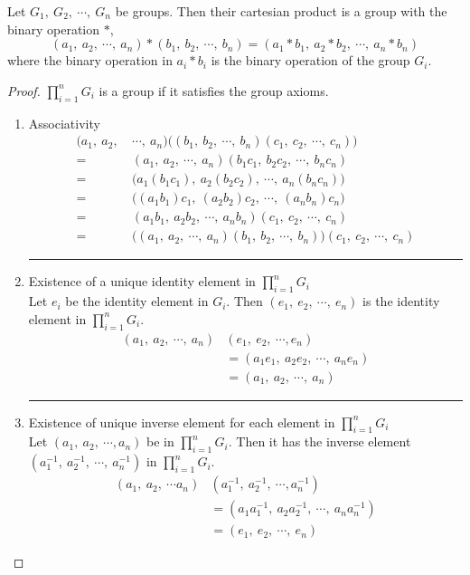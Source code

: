 \begin{theorem}
	Let $G_1,\ G_2,\ \cdots,\ G_n$ be groups.
	Then their cartesian product is a group with the binary operation $\ast$,
	\begin{equation}
		(a_1,\ a_2,\ \cdots,\ a_n) \ast (b_1,\ b_2,\ \cdots,\ b_n) = (a_1 \ast b_1,\ a_2 \ast b_2,\ \cdots,\ a_n \ast b_n)
	\end{equation}
	where the binary operation in  $a_i \ast b_i$ is the binary operation of the group $G_i$.
\end{theorem}
\begin{proof}
	$\prod\limits_{i = 1}^n G_i$ is a group if it satisfies the group axioms.
	\begin{enumerate}[label=G\arabic*]
		\item Associativity
			\begin{align*}
				(a_1,\ a_2,\ & \cdots,\ a_n) \big( (b_1,\ b_2,\ \cdots,\ b_n)(c_1,\ c_2,\ \cdots,\ c_n) \big) \\
				= & (a_1,\ a_2,\ \cdots,\ a_n)(b_1c_1,\ b_2c_2,\ \cdots,\ b_nc_n) \\
				= & \big( a_1(b_1c_1),\ a_2(b_2c_2),\ \cdots,\ a_n(b_nc_n) \big) \\
				= & \big( (a_1 b_1)c_1,\ (a_2b_2)c_2,\ \cdots,\ (a_nb_n )c_n \big) \\
				= &  (a_1b_1,\ a_2b_2,\ \cdots,\ a_nb_n)(c_1,\ c_2,\ \cdots,\ c_n) \\
				= & \big( (a_1,\ a_2,\ \cdots,\ a_n)(b_1,\ b_2,\ \cdots,\ b_n) \big)(c_1,\ c_2,\ \cdots,\ c_n)
			\end{align*}
			\hrule
		\item Existence of a unique identity element in $\prod\limits_{i = 1}^n G_i$\\
			Let $e_i$ be the identity element in $G_i$.
			Then $(e_1,\ e_2,\ \cdots,\ e_n)$ is the identity element in $\prod\limits_{i = 1}^n G_i$.
			\begin{align*}
				(a_1,\ a_2,\ \cdots,\ a_n)&(e_1,\ e_2,\ \cdots, e_n) \\
				& = (a_1e_1,\ a_2e_2,\ \cdots,\ a_ne_n) \\
				& = (a_1,\ a_2,\ \cdots,\ a_n)
			\end{align*}
			\hrule
		\item Existence of unique inverse element for each element in $\prod\limits_{i = 1}^n G_i$\\
			Let $(a_1,\ a_2,\ \cdots, a_n)$ be in $\prod\limits_{i = 1}^n G_i$.
			Then it has the inverse element $( a_1^{-1},\ a_2^{-1},\ \cdots,\ a_n^{-1} )$ in $\prod\limits_{i = 1}^n G_i$.
			\begin{align*}
				(a_1,\ a_2,\ \cdots a_n)&(a_1^{-1},\ a_2^{-1},\ \cdots, a_n^{-1}) \\
				& = (a_1a_1^{-1},\ a_2a_2^{-1},\ \cdots,\ a_na_n^{-1}) \\
				& = (e_1,\ e_2,\ \cdots,\ e_n)
			\end{align*}
	\end{enumerate}
\end{proof}

